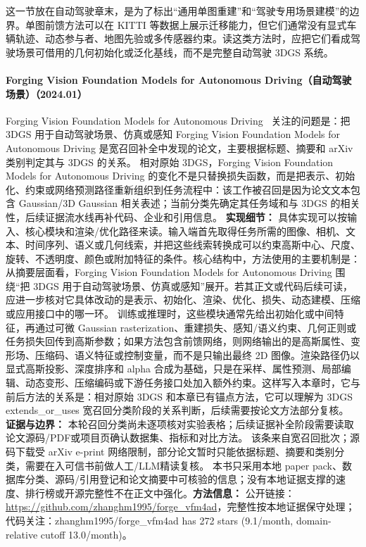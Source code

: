 这一节放在自动驾驶章末，是为了标出“通用单图重建”和“驾驶专用场景建模”的边界。单图前馈方法可以在 KITTI 等数据上展示迁移能力，但它们通常没有显式车辆轨迹、动态参与者、地图先验或多传感器约束。读这类方法时，应把它们看成驾驶场景可借用的几何初始化或泛化基线，而不是完整自动驾驶 3DGS 系统。
\paragraph{Forging Vision Foundation Models for Autonomous Driving（自动驾驶场景）（2024.01）}
Forging Vision Foundation Models for Autonomous Driving~\cite{2401_08045} 关注的问题是：把 3DGS 用于自动驾驶场景、仿真或感知 Forging Vision Foundation Models for Autonomous Driving 是宽召回补全中发现的论文，主要根据标题、摘要和 arXiv 类别判定其与 3DGS 的关系。
相对原始 3DGS，Forging Vision Foundation Models for Autonomous Driving 的变化不是只替换损失函数，而是把表示、初始化、约束或网络预测路径重新组织到任务流程中：该工作被召回是因为论文文本包含 Gaussian/3D Gaussian 相关表述；当前分类先确定其任务域和与 3DGS 的相关性，后续证据流水线再补代码、企业和引用信息。
\textbf{实现细节：} 具体实现可以按输入、核心模块和渲染/优化路径来读。输入端首先取得任务所需的图像、相机、文本、时间序列、语义或几何线索，并把这些线索转换成可以约束高斯中心、尺度、旋转、不透明度、颜色或附加特征的条件。核心结构中，方法使用的主要机制是：从摘要层面看，Forging Vision Foundation Models for Autonomous Driving 围绕“把 3DGS 用于自动驾驶场景、仿真或感知”展开。若其正文或代码后续可读，应进一步核对它具体改动的是表示、初始化、渲染、优化、损失、动态建模、压缩或应用接口中的哪一环。 训练或推理时，这些模块通常先给出初始化或中间特征，再通过可微 Gaussian rasterization、重建损失、感知/语义约束、几何正则或任务损失回传到高斯参数；如果方法包含前馈网络，则网络输出的是高斯属性、变形场、压缩码、语义特征或控制变量，而不是只输出最终 2D 图像。渲染路径仍以显式高斯投影、深度排序和 alpha 合成为基础，只是在采样、属性预测、局部编辑、动态变形、压缩编码或下游任务接口处加入额外约束。这样写入本章时，它与前后方法的关系是：相对原始 3DGS 和本章已有锚点方法，它可以理解为 3DGS extends\_or\_uses 宽召回分类阶段的关系判断，后续需要按论文方法部分复核。
\textbf{证据与边界：} 本轮召回分类尚未逐项核对实验表格；后续证据补全阶段需要读取论文源码/PDF或项目页确认数据集、指标和对比方法。 该条来自宽召回批次；源码下载受 arXiv e-print 网络限制，部分论文暂时只能依据标题、摘要和类别分类，需要在入可信书前做人工/LLM精读复核。 本书只采用本地 paper pack、数据库分类、源码/引用登记和论文摘要中可核验的信息；没有本地证据支撑的速度、排行榜或开源完整性不在正文中强化。\textbf{方法信息：} 公开链接：\url{https://github.com/zhanghm1995/forge\_vfm4ad}，完整性按本地证据保守处理；代码关注：zhanghm1995/forge\_vfm4ad has 272 stars (9.1/month, domain-relative cutoff 13.0/month)。
